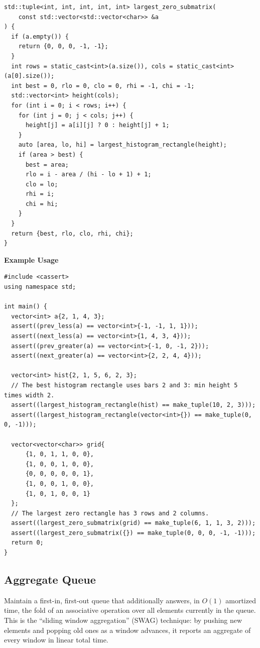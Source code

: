 \begin{lstlisting}[style=cpp]
std::tuple<int, int, int, int, int> largest_zero_submatrix(
    const std::vector<std::vector<char>> &a
) {
  if (a.empty()) {
    return {0, 0, 0, -1, -1};
  }
  int rows = static_cast<int>(a.size()), cols = static_cast<int>(a[0].size());
  int best = 0, rlo = 0, clo = 0, rhi = -1, chi = -1;
  std::vector<int> height(cols);
  for (int i = 0; i < rows; i++) {
    for (int j = 0; j < cols; j++) {
      height[j] = a[i][j] ? 0 : height[j] + 1;
    }
    auto [area, lo, hi] = largest_histogram_rectangle(height);
    if (area > best) {
      best = area;
      rlo = i - area / (hi - lo + 1) + 1;
      clo = lo;
      rhi = i;
      chi = hi;
    }
  }
  return {best, rlo, clo, rhi, chi};
}
\end{lstlisting}
\textbf{Example Usage}\par
\begin{lstlisting}[style=cpp]
#include <cassert>
using namespace std;

int main() {
  vector<int> a{2, 1, 4, 3};
  assert((prev_less(a) == vector<int>{-1, -1, 1, 1}));
  assert((next_less(a) == vector<int>{1, 4, 3, 4}));
  assert((prev_greater(a) == vector<int>{-1, 0, -1, 2}));
  assert((next_greater(a) == vector<int>{2, 2, 4, 4}));

  vector<int> hist{2, 1, 5, 6, 2, 3};
  // The best histogram rectangle uses bars 2 and 3: min height 5 times width 2.
  assert((largest_histogram_rectangle(hist) == make_tuple(10, 2, 3)));
  assert((largest_histogram_rectangle(vector<int>{}) == make_tuple(0, 0, -1)));

  vector<vector<char>> grid{
      {1, 0, 1, 1, 0, 0},
      {1, 0, 0, 1, 0, 0},
      {0, 0, 0, 0, 0, 1},
      {1, 0, 0, 1, 0, 0},
      {1, 0, 1, 0, 0, 1}
  };
  // The largest zero rectangle has 3 rows and 2 columns.
  assert((largest_zero_submatrix(grid) == make_tuple(6, 1, 1, 3, 2)));
  assert((largest_zero_submatrix({}) == make_tuple(0, 0, 0, -1, -1)));
  return 0;
}
\end{lstlisting}
\subsection{Aggregate Queue}
\label{sec:1.2.5}
Maintain a first-in, first-out queue that additionally answers, in $O(1)$ amortized time, the fold of an associative operation over all elements currently in the queue. This is the ``sliding window aggregation'' (SWAG) technique: by pushing new elements and popping old ones as a window advances, it reports an aggregate of every window in linear total time.

